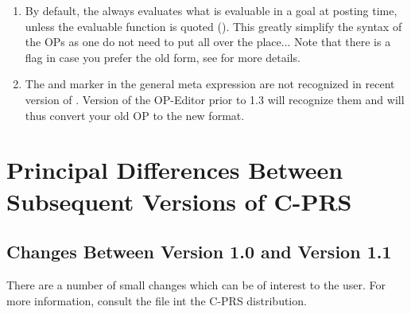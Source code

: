 \begin{enumerate}
\item By default, the \CPK{} always evaluates what is evaluable in a goal
at posting time, unless the evaluable function is quoted (). This greatly simplify the syntax of the OPs as one do not need
to put  all over the place... Note that there is a flag in
case you prefer the old form, see  for
more details.

\item The  and  marker in the general meta expression
are not recognized in recent version of \COPRS{}. Version of the OP-Editor prior
to 1.3 will recognize them and will thus convert your old OP to the new format.

\end{enumerate}

\chapter{Principal Differences Between Subsequent Versions of C-PRS}




\section{Changes Between Version 1.0 and Version 1.1}

There are a number of small changes which can be of interest to the user. For
more information, consult the  file int the C-PRS distribution.

